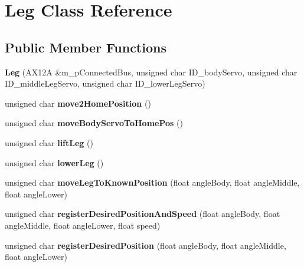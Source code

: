 \hypertarget{class_leg}{}\section{Leg Class Reference}
\label{class_leg}
\subsection*{Public Member Functions}
\begin{DoxyCompactItemize}
\item 
\mbox{\label{class_leg_ab3490019b9bbb3a8bcc32691bf5a6e75}} 
{\bfseries Leg} (A\+X12A \&m\+\_\+p\+Connected\+Bus, unsigned char I\+D\+\_\+body\+Servo, unsigned char I\+D\+\_\+middle\+Leg\+Servo, unsigned char I\+D\+\_\+lower\+Leg\+Servo)
\item 
\mbox{\label{class_leg_a62128cac5af3c307cb7a836d660c4a93}} 
unsigned char {\bfseries move2\+Home\+Position} ()
\item 
\mbox{\label{class_leg_a185aa0c0fd066da2ecff26203e629b64}} 
unsigned char {\bfseries move\+Body\+Servo\+To\+Home\+Pos} ()
\item 
\mbox{\label{class_leg_a7e1d28688ebca828c02eb69d29440701}} 
unsigned char {\bfseries lift\+Leg} ()
\item 
\mbox{\label{class_leg_ae73cb1ba26932cb688f05e73fc3d5693}} 
unsigned char {\bfseries lower\+Leg} ()
\item 
\mbox{\label{class_leg_accdc1ffc9bcaba466ed3ab2432407a05}} 
unsigned char {\bfseries move\+Leg\+To\+Known\+Position} (float angle\+Body, float angle\+Middle, float angle\+Lower)
\item 
\mbox{\label{class_leg_a373f74d8914b95f16df85c00876baaf4}} 
unsigned char {\bfseries register\+Desired\+Position\+And\+Speed} (float angle\+Body, float angle\+Middle, float angle\+Lower, float speed)
\item 
\mbox{\label{class_leg_ac45bb4782f2809e74a63978255ce4294}} 
unsigned char {\bfseries register\+Desired\+Position} (float angle\+Body, float angle\+Middle, float angle\+Lower)
\item 

\end{DoxyCompactItemize}
